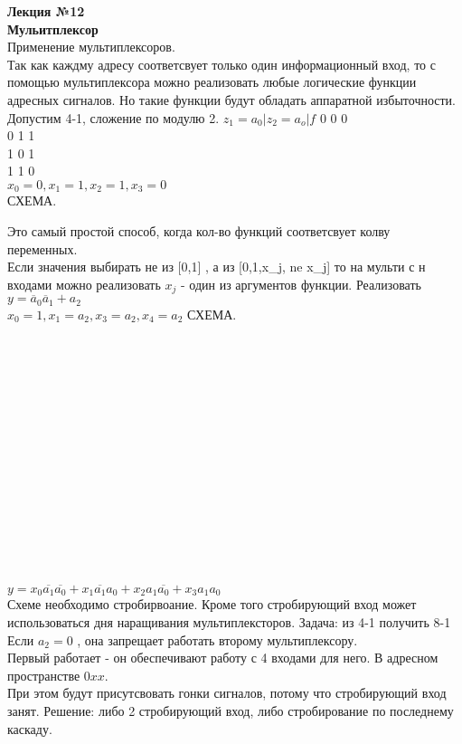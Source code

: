

\LARGE{ \textbf {Лекция №12}}\\
\Large{ \textbf {Мульитплексор}}\\
Применение мультиплексоров.\\
Так как каждму адресу соответсвует только один информационный вход,
то с помощью мультиплексора можно реализовать любые логические функции адресных сигналов.
Но такие функции будут обладать аппаратной избыточности.
Допустим 4-1, сложение по модулю 2.
$z_1=a_0 |z_2 =a_o | f$
0 0 0\\
0 1 1\\
1 0 1\\
1 1 0\\
$x_0 = 0 , x_1 = 1, x_2 = 1, x_3 = 0$\\

СХЕМА.

Это самый простой способ, когда кол-во функций соответсвует колву переменных.\\
Если значения выбирать не из [0,1] , а из [0,1,x_j, ne x_j] то на мульти с н входами можно реализовать
$x_j$ - один из аргументов функции.
Реализовать\\
$y = \overline{a}_0 \overline{a}_1 + a_2$\\
$x_0 = 1, x_1 = a_2, x_3= a_2,x_4= a_2$
СХЕМА.
\\\\\\\\\\\\\\\\\\\\\\\\\\\\\

$y = x_0 \overline{a_1}\overline{a_0} + x_1 \overline{a_1} a_0 + x_2 a_1 \overline{a_0} + x_3 a_1 a_0$\\

Схеме необходимо стробирвоание. Кроме того стробирующий вход может использоваться дня наращивания мультиплексторов.
Задача: из 4-1 получить 8-1\\

Если $a_2 = 0$ , она запрещает работать второму мультиплексору.\\
Первый работает - он обеспечивают работу с 4 входами для него. В адресном пространстве $0xx$. \\
При этом будут присутсвовать гонки сигналов, потому что стробирующий вход занят.
Решение: либо 2 стробирующий вход, либо стробирование по последнему каскаду.

